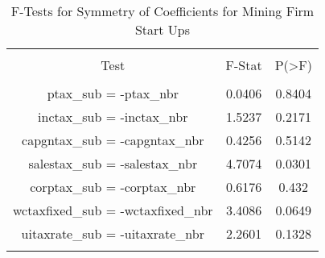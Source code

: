 
\begin{table}[!htbp] \centering 
  \caption{F-Tests for Symmetry of Coefficients for Mining Firm Start Ups} 
  \label{21Ftests} 
\begin{tabular}{@{\extracolsep{5pt}} ccc} 
\\[-1.8ex]\hline 
\hline \\[-1.8ex] 
Test & F-Stat & P(\textgreater F) \\ 
\hline \\[-1.8ex] 
ptax\_sub = -ptax\_nbr & 0.0406 & 0.8404 \\ 
inctax\_sub = -inctax\_nbr & 1.5237 & 0.2171 \\ 
capgntax\_sub = -capgntax\_nbr & 0.4256 & 0.5142 \\ 
salestax\_sub = -salestax\_nbr & 4.7074 & 0.0301 \\ 
corptax\_sub = -corptax\_nbr & 0.6176 & 0.432 \\ 
wctaxfixed\_sub = -wctaxfixed\_nbr & 3.4086 & 0.0649 \\ 
uitaxrate\_sub = -uitaxrate\_nbr & 2.2601 & 0.1328 \\ 
\hline \\[-1.8ex] 
\end{tabular} 
\end{table} 
